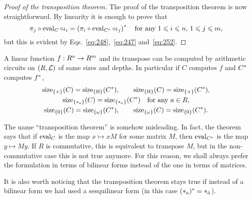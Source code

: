 \begin{proof}[Proof of the transposition theorem]
  The proof of the transposition theorem is now straightforward. By linearity
  it is enough to prove that
  \begin{equation}
    \label{eq:242}
    \pi_j\circ\operatorname{eval}_C\circ\iota_i =
    \left(\pi_i\circ\operatorname{eval}_{C^\ast}\circ\iota_j \right)^\ast
    \quad\text{for any $1\leqslant i\leqslant n$, $1\leqslant j\leqslant m$,}
  \end{equation}
  but this is evident by Eqs.~\eqref{eq:248},~\eqref{eq:247}
  and~\eqref{eq:252}.
\end{proof}

\begin{corollary}
  \label{th:tellegen-coro}
  A linear function $f:R^n\rightarrow R^m$ and its transpose can be computed
  by arithmetic circuits on $(R,\mathcal{L})$ of same sizes and depths. In
  particular if $C$ computes $f$ and $C^\ast$ computes $f^\ast$,
  \begin{gather*}
    \operatorname{size}_{\{+\}}(C) = \operatorname{size}_{\{\operatorname{H}\}}(C^\ast), \qquad  
    \operatorname{size}_{\{\operatorname{H}\}}(C) = \operatorname{size}_{\{+\}}(C^\ast), \\
    \operatorname{size}_{\{*_a\}}(C) = \operatorname{size}_{\{*_a\}}(C^\ast)\quad\text{for any $a\in R$},\\
    \operatorname{size}_{\{0\}}(C) = \operatorname{size}_{\{\omega\}}(C^\ast), \qquad 
    \operatorname{size}_{\{\omega\}}(C) = \operatorname{size}_{\{0\}}(C^\ast).
  \end{gather*}
\end{corollary}

\begin{remark}
  \label{rk:tellegen}
  The name ``transposition theorem'' is somehow misleading. In fact,
  the theorem says that if $\operatorname{eval}_C$ is the map $x\mapsto xM$ for some
  matrix $M$, then $\operatorname{eval}_{C^\ast}$ is the map $y\mapsto My$. If $R$
  is commutative, this is equivalent to transpose $M$, but in the
  non-commutative case this is not true anymore. For this reason, we
  shall always prefer the formulation in terms of bilinear forms
  instead of the one in terms of matrices.

    It is also worth noticing that the transposition
  theorem stays true if instead of a bilinear form we had used a
  sesquilinear form (in this case $(*_{a})^\ast=*_{\bar{a}}$).
\end{remark}


